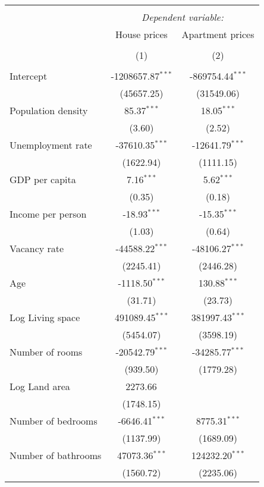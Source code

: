 \begin{table}[!htbp] \centering
\begin{tabular}{@{\extracolsep{5pt}}lcc}
\\[-1.8ex]\hline
\hline \\[-1.8ex]
& \multicolumn{2}{c}{\textit{Dependent variable:}} \
\cr \cline{2-3}
\\[-1.8ex] & \multicolumn{1}{c}{House prices} & \multicolumn{1}{c}{Apartment prices}  \\
\\[-1.8ex] & (1) & (2) \\
\hline \\[-1.8ex]
 Intercept & -1208657.87$^{***}$ & -869754.44$^{***}$ \\
  & (45657.25) & (31549.06) \\
 Population density & 85.37$^{***}$ & 18.05$^{***}$ \\
  & (3.60) & (2.52) \\
 Unemployment rate & -37610.35$^{***}$ & -12641.79$^{***}$ \\
  & (1622.94) & (1111.15) \\
 GDP per capita & 7.16$^{***}$ & 5.62$^{***}$ \\
  & (0.35) & (0.18) \\
 Income per person & -18.93$^{***}$ & -15.35$^{***}$ \\
  & (1.03) & (0.64) \\
 Vacancy rate & -44588.22$^{***}$ & -48106.27$^{***}$ \\
  & (2245.41) & (2446.28) \\
 Age & -1118.50$^{***}$ & 130.88$^{***}$ \\
  & (31.71) & (23.73) \\
 Log Living space & 491089.45$^{***}$ & 381997.43$^{***}$ \\
  & (5454.07) & (3598.19) \\
 Number of rooms & -20542.79$^{***}$ & -34285.77$^{***}$ \\
  & (939.50) & (1779.28) \\
 Log Land area & 2273.66$^{}$ & \\
  & (1748.15) & \\
 Number of bedrooms & -6646.41$^{***}$ & 8775.31$^{***}$ \\
  & (1137.99) & (1689.09) \\
 Number of bathrooms & 47073.36$^{***}$ & 124232.20$^{***}$ \\
  & (1560.72) & (2235.06) \\

\end{tabular}
\end{table}
